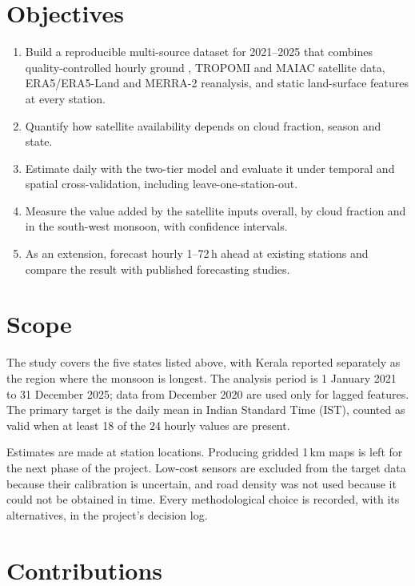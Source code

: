 \section{Objectives}

\begin{enumerate}
  \item Build a reproducible multi-source dataset for 2021--2025 that combines quality-controlled
        hourly ground \pmtf{}, TROPOMI and MAIAC satellite data, ERA5/ERA5-Land and MERRA-2
        reanalysis, and static land-surface features at every station.
  \item Quantify how satellite availability depends on cloud fraction, season and state.
  \item Estimate daily \pmtf{} with the two-tier model and evaluate it under temporal and spatial
        cross-validation, including leave-one-station-out.
  \item Measure the value added by the satellite inputs overall, by cloud fraction and in the
        south-west monsoon, with confidence intervals.
  \item As an extension, forecast hourly \pmtf{} 1--72\,h ahead at existing stations and compare the
        result with published forecasting studies.
\end{enumerate}

\section{Scope}

The study covers the five states listed above, with Kerala reported separately as the region where
the monsoon is longest. The analysis period is 1 January 2021 to 31 December 2025; data from
December 2020 are used only for lagged features. The primary target is the daily mean in Indian
Standard Time (IST), counted as valid when at least 18 of the 24 hourly values are present.

Estimates are made at station locations. Producing gridded 1\,km maps is left for the next phase
of the project. Low-cost sensors are excluded from the target data because their calibration is
uncertain, and road density was not used because it could not be obtained in time. Every
methodological choice is recorded, with its alternatives, in the project's decision log.

\section{Contributions}

